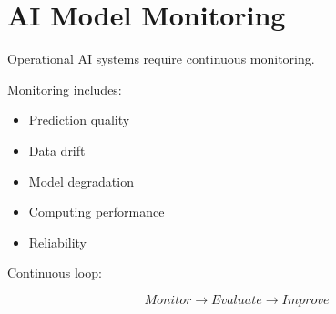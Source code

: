 \section{AI Model Monitoring}


Operational AI systems require continuous monitoring.



Monitoring includes:


\begin{itemize}

\item Prediction quality

\item Data drift

\item Model degradation

\item Computing performance

\item Reliability

\end{itemize}



Continuous loop:


\[
Monitor
\rightarrow
Evaluate
\rightarrow
Improve
\]
